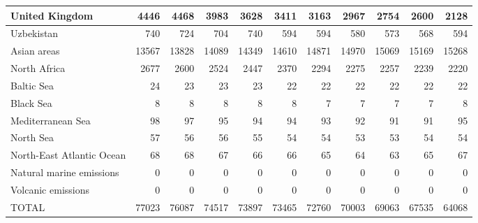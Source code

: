 \begin{table}
\begin{tabular}{|l|r|r|r|r|r|r|r|r|r|r|}
                United Kingdom&   4446&   4468&   3983&   3628&   3411&   3163&   2967&   2754&   2600&   2128\\\hline
                    Uzbekistan&    740&    724&    704&    740&    594&    594&    580&    573&    568&    594\\\hline
                   Asian areas&  13567&  13828&  14089&  14349&  14610&  14871&  14970&  15069&  15169&  15268\\\hline
                  North Africa&   2677&   2600&   2524&   2447&   2370&   2294&   2275&   2257&   2239&   2220\\\hline
                    Baltic Sea&     24&     23&     23&     23&     22&     22&     22&     22&     22&     22\\\hline
                     Black Sea&      8&      8&      8&      8&      8&      7&      7&      7&      7&      8\\\hline
             Mediterranean Sea&     98&     97&     95&     94&     94&     93&     92&     91&     91&     95\\\hline
                     North Sea&     57&     56&     56&     55&     54&     54&     53&     53&     54&     54\\\hline
     North-East Atlantic Ocean&     68&     68&     67&     66&     66&     65&     64&     63&     65&     67\\\hline
      Natural marine emissions&      0&      0&      0&      0&      0&      0&      0&      0&      0&      0\\\hline
            Volcanic emissions&      0&      0&      0&      0&      0&      0&      0&      0&      0&      0\\\hline\hline
                         TOTAL&  77023&  76087&  74517&  73897&  73465&  72760&  70003&  69063&  67535&  64068\\\hline
 \end{tabular}
 \end{table}
 
